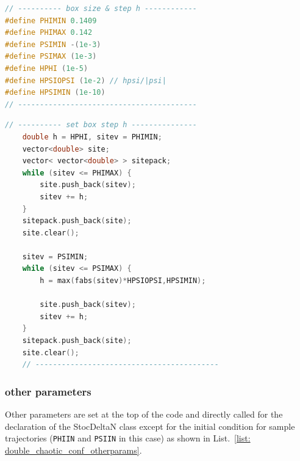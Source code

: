 \documentclass[aps, prd
, preprint
, nofootinbib 
, notitlepage
, superscriptaddress
, longbibliography
]{revtex4-1}
\begin{document}
\begin{lstlisting}[language = C++, caption={\textit{sample/hybrid\_conf.cpp}}, label=list: hybrid_conf_box, firstnumber = 6]
// ---------- box size & step h ------------
#define PHIMIN 0.1409
#define PHIMAX 0.142
#define PSIMIN -(1e-3)
#define PSIMAX (1e-3)
#define HPHI (1e-5)
#define HPSIOPSI (1e-2) // hpsi/|psi|
#define HPSIMIN (1e-10)
// -----------------------------------------
\end{lstlisting}
\begin{lstlisting}[language = C++, firstnumber = 57]
	// ---------- set box step h ---------------
	double h = HPHI, sitev = PHIMIN;
	vector<double> site;
	vector< vector<double> > sitepack;
	while (sitev <= PHIMAX) {
		site.push_back(sitev);
		sitev += h;
	}
	sitepack.push_back(site);
	site.clear();

	sitev = PSIMIN;
	while (sitev <= PSIMAX) {
		h = max(fabs(sitev)*HPSIOPSI,HPSIMIN);

		site.push_back(sitev);
		sitev += h;	
	}
	sitepack.push_back(site);
	site.clear();
	// ------------------------------------------
\end{lstlisting}

\subsubsection{other parameters}

Other parameters are set at the top of the code and directly called for the declaration of the StocDeltaN class except for the initial condition for sample trajectories
(\texttt{PHIIN} and \texttt{PSIIN} in this case) as shown in List.~\ref{list: double_chaotic_conf_otherparams}.
\end{document}
